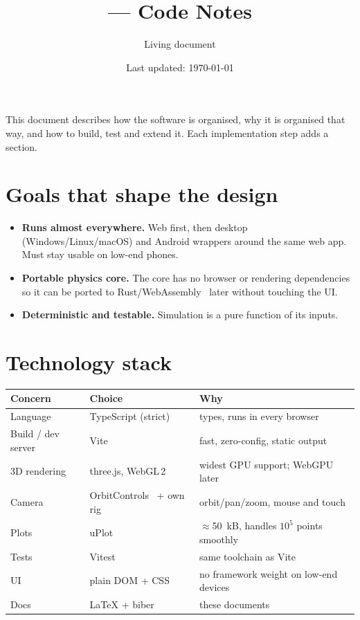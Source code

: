 \documentclass[11pt]{article}
\title{\project{} --- Code Notes}
\author{Living document}
\date{Last updated: \today}
\begin{document}
\maketitle
\noindent This document describes how the software is organised, why it is organised
that way, and how to build, test and extend it. Each implementation step adds a section.

\tableofcontents

\section{Goals that shape the design}
\begin{itemize}
  \item \textbf{Runs almost everywhere.} Web first, then desktop (Windows/Linux/macOS) and Android
        wrappers around the same web app. Must stay usable on low-end phones.
  \item \textbf{Portable physics core.} The core has no browser or rendering dependencies so it can
        be ported to Rust/WebAssembly~\cite{wasmbindgen} later without touching the UI.
  \item \textbf{Deterministic and testable.} Simulation is a pure function of its inputs.
\end{itemize}

\section{Technology stack}
\begin{center}
\begin{tabular}{@{}lll@{}}
\toprule
Concern & Choice & Why \\ \midrule
Language & TypeScript (strict)~\cite{tshandbook} & types, runs in every browser \\
Build / dev server & Vite~\cite{vite} & fast, zero-config, static output \\
3D rendering & three.js, WebGL\,2~\cite{threejs} & widest GPU support; WebGPU later \\
Camera & OrbitControls~\cite{orbitcontrols} + own rig & orbit/pan/zoom, mouse and touch \\
Plots & uPlot~\cite{uplot} & $\approx$\SI{50}{kB}, handles $10^5$ points smoothly \\
Tests & Vitest~\cite{vitest} & same toolchain as Vite \\
UI & plain DOM + CSS & no framework weight on low-end devices \\
Docs & \LaTeX{} + biber & these documents \\ \bottomrule
\end{tabular}
\end{center}
\end{document}
